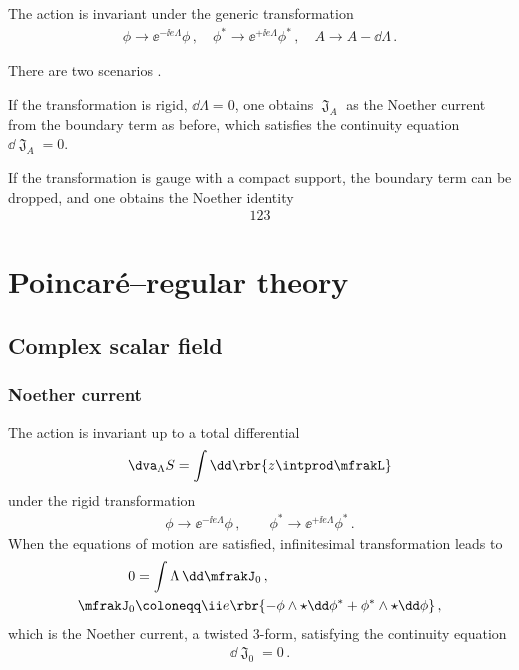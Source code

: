 \documentclass[a4paper]{article}
\begin{document}
The action is invariant under the generic transformation
\begin{align}
\phi \to \ee^{-\ii e \Lambda} \phi\,,\quad
\phi^* \to \ee^{+\ii e \Lambda} \phi^*\,,\quad
A \to A - \dd \Lambda\,.
\end{align}

There are two scenarios \cite{Avery2015}.

If the transformation is rigid, $\dd \Lambda = 0$, one obtains $\mfrakJ_A$ as 
the Noether current from the boundary term as before, which satisfies the 
continuity equation $\dd \mfrakJ_A = 0$.

If the transformation is gauge with a compact support, the boundary term can be
dropped, and one obtains the Noether identity
\begin{align}
123
\end{align}


\section{Poincaré--regular theory}



\subsection{Complex scalar field}

\subsubsection{Noether current}
The action is invariant up to a total differential
\begin{align}
\dva_{\Lambda} S = \int \dd\rbr{z \intprod \mfrakL}
\end{align}
under the rigid transformation
\begin{align}
\phi \to \ee^{-\ii e \Lambda} \phi\,,\qquad
\phi^* \to \ee^{+\ii e \Lambda} \phi^*\,.
\end{align}
When the equations of motion are satisfied, infinitesimal 
transformation leads to
\begin{align}
0 &= \int \Lambda\, \dd \mfrakJ_0\,,
\nonumber \\
\mfrakJ_0 &\coloneqq \ii e\rbr{- \phi\wedge\star\dd\phi^* +
	\phi^*\wedge\star\dd\phi}\,,
\end{align}
which is the Noether current, a twisted $3$-form, satisfying the continuity 
equation
\begin{align}
\dd \mfrakJ_0 = 0\,.
\end{align}
\end{document}

